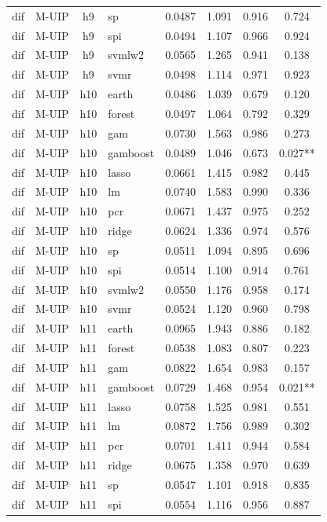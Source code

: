 \begin{ThreePartTable}
\begin{longtable}[t]{llclcccc}
dif & M-UIP & h9 & sp & 0.0487 & 1.091 & 0.916 & 0.724\\
dif & M-UIP & h9 & spi & 0.0494 & 1.107 & 0.966 & 0.924\\
dif & M-UIP & h9 & svmlw2 & 0.0565 & 1.265 & 0.941 & 0.138\\
dif & M-UIP & h9 & svmr & 0.0498 & 1.114 & 0.971 & 0.923\\
\addlinespace
dif & M-UIP & h10 & earth & 0.0486 & 1.039 & 0.679 & 0.120\\
dif & M-UIP & h10 & forest & 0.0497 & 1.064 & 0.792 & 0.329\\
dif & M-UIP & h10 & gam & 0.0730 & 1.563 & 0.986 & 0.273\\
dif & M-UIP & h10 & gamboost & 0.0489 & 1.046 & 0.673 & 0.027**\\
dif & M-UIP & h10 & lasso & 0.0661 & 1.415 & 0.982 & 0.445\\
dif & M-UIP & h10 & lm & 0.0740 & 1.583 & 0.990 & 0.336\\
dif & M-UIP & h10 & pcr & 0.0671 & 1.437 & 0.975 & 0.252\\
dif & M-UIP & h10 & ridge & 0.0624 & 1.336 & 0.974 & 0.576\\
dif & M-UIP & h10 & sp & 0.0511 & 1.094 & 0.895 & 0.696\\
dif & M-UIP & h10 & spi & 0.0514 & 1.100 & 0.914 & 0.761\\
dif & M-UIP & h10 & svmlw2 & 0.0550 & 1.176 & 0.958 & 0.174\\
dif & M-UIP & h10 & svmr & 0.0524 & 1.120 & 0.960 & 0.798\\
\addlinespace
dif & M-UIP & h11 & earth & 0.0965 & 1.943 & 0.886 & 0.182\\
dif & M-UIP & h11 & forest & 0.0538 & 1.083 & 0.807 & 0.223\\
dif & M-UIP & h11 & gam & 0.0822 & 1.654 & 0.983 & 0.157\\
dif & M-UIP & h11 & gamboost & 0.0729 & 1.468 & 0.954 & 0.021**\\
dif & M-UIP & h11 & lasso & 0.0758 & 1.525 & 0.981 & 0.551\\
dif & M-UIP & h11 & lm & 0.0872 & 1.756 & 0.989 & 0.302\\
dif & M-UIP & h11 & pcr & 0.0701 & 1.411 & 0.944 & 0.584\\
dif & M-UIP & h11 & ridge & 0.0675 & 1.358 & 0.970 & 0.639\\
dif & M-UIP & h11 & sp & 0.0547 & 1.101 & 0.918 & 0.835\\
dif & M-UIP & h11 & spi & 0.0554 & 1.116 & 0.956 & 0.887\\

\end{longtable}
\end{ThreePartTable}
